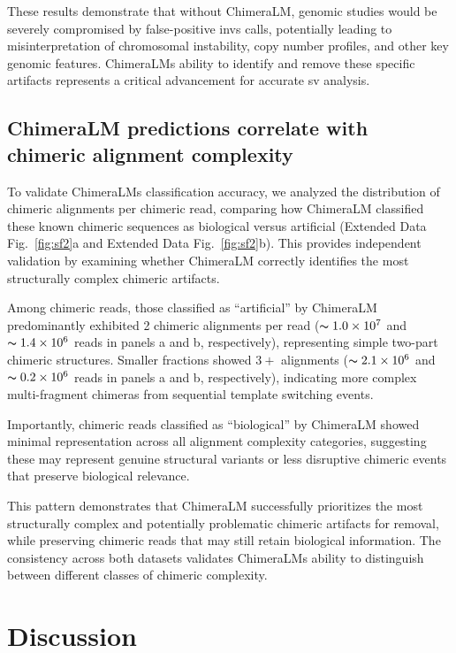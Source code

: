 \documentclass[pdflatex,sn-nature]{sn-jnl}%
\theoremstyle{thmstyleone}%
\theoremstyle{thmstyletwo}%
\theoremstyle{thmstylethree}%
\begin{document}
These results demonstrate that without ChimeraLM, genomic studies would be severely compromised by false-positive \glspl{inv} calls, potentially leading to misinterpretation of chromosomal instability, copy number profiles, and other key genomic features.
ChimeraLM\textquotesingle s ability to identify and remove these specific artifacts represents a critical advancement for accurate \gls{sv} analysis.

\subsection*{ChimeraLM predictions correlate with chimeric alignment complexity}

To validate ChimeraLM\textquotesingle s classification accuracy, we analyzed the distribution of chimeric alignments per chimeric read, comparing how ChimeraLM classified these known chimeric sequences as biological versus artificial (Extended Data Fig.~\ref{fig:sf2}a and Extended Data Fig.~\ref{fig:sf2}b).
This provides independent validation by examining whether ChimeraLM correctly identifies the most structurally complex chimeric artifacts.

Among chimeric reads, those classified as ``artificial'' by ChimeraLM predominantly exhibited 2 chimeric alignments per read ($\thicksim 1.0 \times 10^7$ and $\thicksim 1.4 \times 10^6$ reads in panels a and b, respectively), representing simple two-part chimeric structures.
Smaller fractions showed $3+$ alignments ($\thicksim 2.1 \times 10^6$ and $\thicksim 0.2 \times 10^6$ reads in panels a and b, respectively), indicating more complex multi-fragment chimeras from sequential template switching events.

Importantly, chimeric reads classified as ``biological'' by ChimeraLM showed minimal representation across all alignment complexity categories, suggesting these may represent genuine structural variants or less disruptive chimeric events that preserve biological relevance.

This pattern demonstrates that ChimeraLM successfully prioritizes the most structurally complex and potentially problematic chimeric artifacts for removal, while preserving chimeric reads that may still retain biological information.
The consistency across both datasets validates ChimeraLM\textquotesingle s ability to distinguish between different classes of chimeric complexity.

\section*{Discussion}
\end{document}
